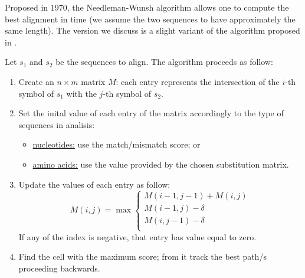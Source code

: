 \documentclass{subfiles}
\begin{document}
    Proposed in 1970, the Needleman-Wunsh algorithm allows one to compute the best alignment 
    in  time (we assume the two sequences to have approximately the same length).
    The version we discuss is a slight variant of the algorithm proposed in \cite{needleman1970}.

    Let \(s_{1}\) and \(s_{2}\) be the sequences to align. The algorithm proceeds as follow:
    \begin{enumerate}
        \item Create an \(n \times m\) matrix \(M\): each entry represents the intersection of the 
            \(i\)-th symbol of \(s_{1}\) with the \(j\)-th symbol of \(s_{2}\).
        \item Set the inital value of each entry of the matrix accordingly to the type 
                of sequences in analisis:
            \begin{itemize}
                \item \underline{nucleotides:} use the match/mismatch score; or 
                \item \underline{amino acids:} use the value provided by the chosen substitution matrix.
            \end{itemize}
        \item Update the values of each entry as follow:
            \[
                M(i, j) = \max \begin{cases}
                    M(i - 1, j - 1) + M(i, j) \\ 
                    M(i - 1, j) - \delta \\ 
                    M(i, j - 1) - \delta \\
                \end{cases}
            \]
            If any of the index is negative, that entry has value equal to zero.
        \item Find the cell with the maximum score; from it track the best path/s proceeding backwards.
    \end{enumerate}
\end{document}
